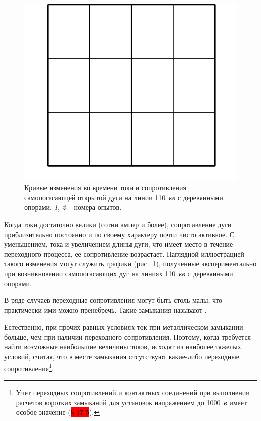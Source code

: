 \begin{figure}
\centering
\includegraphics[width=0.95\linewidth]{pic/1-1}
\caption{Кривые изменения во времени тока и сопротивления самопогасающей открытой дуги на линии 110~\textit{кв} с деревянными опорами. \textit{1, 2} -- номера опытов.}
\label{fig:r-and-I}
\end{figure}


Когда токи достаточно велики (сотни ампер и более), сопротивление дуги приблизительно постоянно и по своему характеру почти чисто активное. С уменьшением, тока и увеличением длины дуги, что имеет место в течение переходного процесса, ее сопротивление возрастает. Наглядной иллюстрацией такого изменения могут служить графики (рис.~\ref{fig:r-and-I}), полученные экспериментально при возникновении самопогасающих дуг на линиях 110~\textit{кв} с деревянными опорами.

В ряде случаев переходные сопротивления могут быть столь малы, что практически ими можно пренебречь. Такие замыкания называют \mbox{}.

Естественно, при прочих равных условиях ток при металлическом замыкании больше, чем при наличии переходного сопротивления. Поэтому, когда требуется найти возможные наибольшие величины токов, исходят из наиболее тяжелых условий, считая, что в месте замыкания отсутствуют какие-либо переходные сопротивления\footnote{Учет переходных сопротивлений и контактных соединений при выполнении расчетов коротких замыканий для установок напряжением до 1000~\textit{в} имеет особое значение (\colorbox{red}{§ 17-5}).}.

